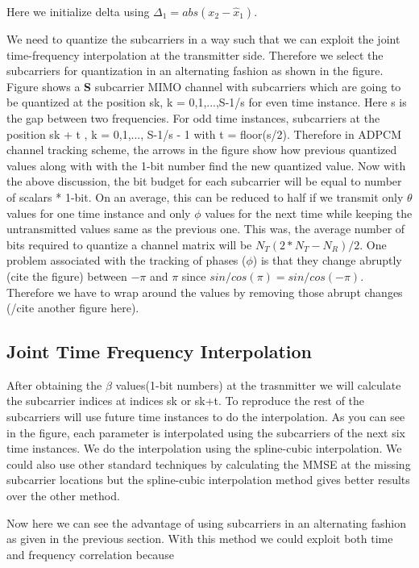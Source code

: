 \documentclass[conference]{IEEEtran}
\begin{document}
Here we initialize delta using $\Delta_1 = abs(x_{2}-\hat{x}_1)$.

We need to quantize the subcarriers in a way such that we can exploit the joint time-frequency interpolation at the transmitter side. Therefore we select the subcarriers for quantization in an alternating fashion as shown in the figure. Figure shows a \textbf{S} subcarrier MIMO channel with subcarriers which are going to be quantized at the position sk, k = 0,1,...,S-1/s for even time instance. Here s is the gap between two frequencies. For odd time instances, subcarriers at the position sk + t , k = 0,1,..., S-1/s - 1 with t = floor(s/2).
Therefore in ADPCM channel tracking scheme, the arrows in the figure show how previous quantized values along with with the 1-bit number find the new quantized value. Now with the above discussion, the bit budget for each subcarrier will be equal to number of scalars * 1-bit. On an average, this can be reduced to half if we transmit only $\theta$ values for one time instance and only $\phi$ values for the next time while keeping the untransmitted values same as the previous one. This was, the average number of bits required to quantize a channel matrix will be $N_{T}(2*N_{T} - N_{R})/2$. 
One problem associated with the tracking of phases ($\phi$) is that they change abruptly (cite the figure) between $-\pi$ and $\pi$ since $sin/cos(\pi) = sin/cos(-\pi)$. Therefore we have to wrap around the values by removing those abrupt changes (/cite another figure here).

\subsection{Joint Time Frequency Interpolation}
\label{interp}

After obtaining the $\beta$ values(1-bit numbers) at the trasnmitter we will calculate the subcarrier indices at indices sk or sk+t. To reproduce the rest of the subcarriers will use future time instances to do the interpolation. As you can see in the figure, each parameter is interpolated using the subcarriers of the next six time instances. We do the interpolation using the spline-cubic interpolation. We could also use other standard techniques by calculating the MMSE at the missing subcarrier locations but the spline-cubic interpolation method gives better results over the other method. 

Now here we can see the advantage of using subcarriers in an alternating fashion as given in the previous section. With this method we could exploit both time and frequency correlation because 
\end{document}
